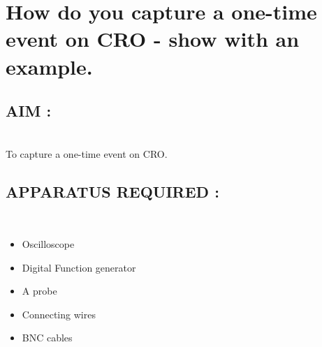 \documentclass[report]{IEEEtran}
\begin{document}
\newpage
\section{How do you capture a one-time event on CRO - show with an example.}

\subsection{AIM : } \\
To capture a one-time event on CRO.

\subsection{APPARATUS REQUIRED : } \\
\begin{itemize}
	\item Oscilloscope
	\item Digital Function generator
	\item A probe
	\item Connecting wires
	\item BNC cables
\end{itemize}
\end{document}
